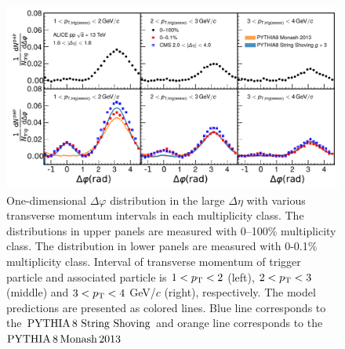 

\begin{figure}[h!]
	\centering
	\includegraphics[width=0.9\linewidth]{./figures/Fig2_PlotDeltaPhi.pdf}
	\caption{One-dimensional $\Delta\varphi$ distribution in the large $\Delta\eta$ with various transverse momentum intervals in each multiplicity class. The distributions in upper panels are measured with 0--100\% multiplicity class. The distribution in lower panels are measured with 0-0.1\% multiplicity class. Interval of transverse momentum of trigger particle and associated particle is $1<p_\mathrm{T}<2$ (left), $2<p_\mathrm{T}<3$ (middle) and $3<p_\mathrm{T}<4$ GeV/$c$ (right), respectively. The model predictions are presented as colored lines. Blue line corresponds to the $\mathrm{PYTHIA}\,8~\mathrm{String}~\mathrm{Shoving}$ and orange line corresponds to the $\mathrm{PYTHIA}\,8\,\mathrm{Monash}\,2013$}
	\label{fig:PlotDeltaPhi}
\end{figure}

